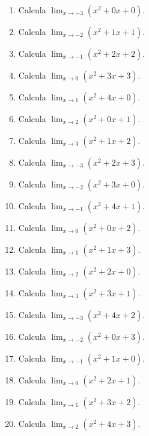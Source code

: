\documentclass[11pt,a4paper]{article}
\begin{document}
\begin{enumerate}[label=\textbf{E\arabic*.},start=601]

\item Calcula $\displaystyle\lim_{x\to -3}(x^2+0x+0)$.

\item Calcula $\displaystyle\lim_{x\to -2}(x^2+1x+1)$.

\item Calcula $\displaystyle\lim_{x\to -1}(x^2+2x+2)$.

\item Calcula $\displaystyle\lim_{x\to 0}(x^2+3x+3)$.

\item Calcula $\displaystyle\lim_{x\to 1}(x^2+4x+0)$.

\item Calcula $\displaystyle\lim_{x\to 2}(x^2+0x+1)$.

\item Calcula $\displaystyle\lim_{x\to 3}(x^2+1x+2)$.

\item Calcula $\displaystyle\lim_{x\to -3}(x^2+2x+3)$.

\item Calcula $\displaystyle\lim_{x\to -2}(x^2+3x+0)$.

\item Calcula $\displaystyle\lim_{x\to -1}(x^2+4x+1)$.

\item Calcula $\displaystyle\lim_{x\to 0}(x^2+0x+2)$.

\item Calcula $\displaystyle\lim_{x\to 1}(x^2+1x+3)$.

\item Calcula $\displaystyle\lim_{x\to 2}(x^2+2x+0)$.

\item Calcula $\displaystyle\lim_{x\to 3}(x^2+3x+1)$.

\item Calcula $\displaystyle\lim_{x\to -3}(x^2+4x+2)$.

\item Calcula $\displaystyle\lim_{x\to -2}(x^2+0x+3)$.

\item Calcula $\displaystyle\lim_{x\to -1}(x^2+1x+0)$.

\item Calcula $\displaystyle\lim_{x\to 0}(x^2+2x+1)$.

\item Calcula $\displaystyle\lim_{x\to 1}(x^2+3x+2)$.

\item Calcula $\displaystyle\lim_{x\to 2}(x^2+4x+3)$.

\end{enumerate}
\end{document}
